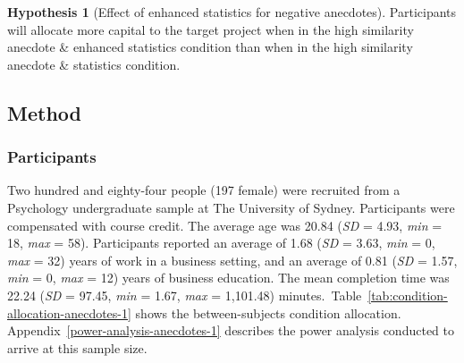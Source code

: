 \documentclass[a4paper, nobind, dvipsnames]{templates/ociamthesis}
\theoremstyle{definition}
\theoremstyle{definition}
\theoremstyle{definition}
\theoremstyle{definition}
\newtheorem{hypothesis}{Hypothesis}[chapter]
\theoremstyle{remark}
\begin{document}
\begin{hypothesis}[Effect of enhanced statistics for negative anecdotes]
\protect\hypertarget{hyp:enhanced-statistics-anecdotes-1}{}{\label{hyp:enhanced-statistics-anecdotes-1} {} }Participants will allocate more capital to the target project when in the high
similarity anecdote \& enhanced statistics condition than when in the high
similarity anecdote \& statistics condition.
\end{hypothesis}

\hypertarget{method-anecdotes-1}{%
\subsection{Method}\label{method-anecdotes-1}}

\subsubsection{Participants}

Two hundred and eighty-four people (197 female) were recruited from a Psychology undergraduate sample at The University of Sydney. Participants were compensated with course credit. The average age was 20.84 (\emph{SD} = 4.93, \emph{min} = 18, \emph{max} = 58). Participants reported an average of 1.68 (\emph{SD} = 3.63, \emph{min} = 0, \emph{max} = 32) years of work in a business setting, and an average of 0.81 (\emph{SD} = 1.57, \emph{min} = 0, \emph{max} = 12) years of business education. The mean completion time was 22.24 (\emph{SD} = 97.45, \emph{min} = 1.67, \emph{max} = 1,101.48) minutes.~Table~\ref{tab:condition-allocation-anecdotes-1}
shows the between-subjects condition allocation.
Appendix~\ref{power-analysis-anecdotes-1} describes the power analysis
conducted to arrive at this sample size.
\end{document}
